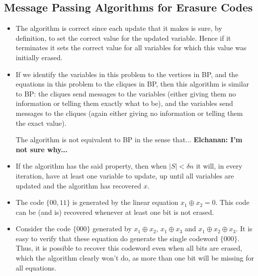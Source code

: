 \documentclass[11pt]{article} \usepackage{amssymb}
\begin{document}
\subsection{Message Passing Algorithms for Erasure Codes}
\begin{itemize}
\item The algorithm is correct since each update that it makes is
  sure, by definition, to set the correct value for the updated
  variable. Hence if it terminates it sets the correct value for all
  variables for which this value was initially erased.
\item If we identify the variables in this problem to the vertices in
  BP, and the equations in this problem to the cliques in BP, then
  this algorithm is similar to BP: the cliques send messages to the
  variables (either giving them no information or telling them exactly
  what to be), and the variables send messages to the cliques (again
  either giving no information or telling them the exact value).

  The algorithm is not equivalent to BP in the sense that... {\bf
    Elchanan: I'm not sure why...}
\item If the algorithm has the said property, then when $|S|<\delta n$
  it will, in every iteration, have at least one variable to update,
  up until all variables are updated and the algorithm has recovered $x$.
\item The code $\{00,11\}$ is generated by the linear equation
  $x_1 \oplus x_2=0$. This code can be (and is) recovered whenever at
  least one bit is not erased.
\item Consider the code $\{000\}$ generated by $x_1 \oplus x_2$,
  $x_1\oplus x_3$ and $x_1\oplus x_2 \oplus x_3$. It is easy to verify
  that these equation do generate the single codeword $\{000\}$. Thus,
  it is possible to recover this codeword even when all bits are
  erased, which the algorithm clearly won't do, as more than one bit
  will be missing for all equations.
\end{itemize}
\end{document}
